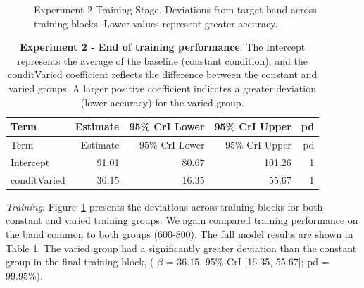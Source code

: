 \documentclass[
  12pt,
  letterpaper,
]{article}
\begin{document}
\begin{figure}


\caption{\label{fig-e2-train-dev}Experiment 2 Training Stage. Deviations
from target band across training blocks. Lower values represent greater
accuracy.}

\end{figure}%

\begin{longtable}[]{@{}lrrrr@{}}
\caption{\textbf{Experiment 2 - End of training performance}. The
Intercept represents the average of the baseline (constant condition),
and the conditVaried coefficient reflects the difference between the
constant and varied groups. A larger positive coefficient indicates a
greater deviation (lower accuracy) for the varied
group.}\label{tbl-e2-train-dist}\tabularnewline
\toprule\noalign{}
Term & Estimate & 95\% CrI Lower & 95\% CrI Upper & pd \\
\midrule\noalign{}
\endfirsthead
\toprule\noalign{}
Term & Estimate & 95\% CrI Lower & 95\% CrI Upper & pd \\
\midrule\noalign{}
\endhead
\bottomrule\noalign{}
\endlastfoot
Intercept & 91.01 & 80.67 & 101.26 & 1 \\
conditVaried & 36.15 & 16.35 & 55.67 & 1 \\
\end{longtable}

\hfill\break

\emph{Training}. Figure~\ref{fig-e2-train-dev} presents the deviations
across training blocks for both constant and varied training groups. We
again compared training performance on the band common to both groups
(600-800). The full model results are shown in Table 1. The varied group
had a significantly greater deviation than the constant group in the
final training block, ( \(\beta\) = 36.15, 95\% CrI {[}16.35, 55.67{]};
pd = 99.95\%).
\end{document}
